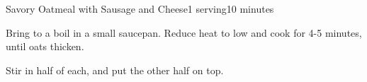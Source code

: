 \documentclass[../Cookbook.tex]{subfiles}
\begin{document}
\begin{recipe}{Savory Oatmeal with Sausage and Cheese}{1 serving}{10 minutes}

Bring to a boil in a small saucepan. Reduce heat to low and cook for 4-5 minutes, until oats thicken.

Stir in half of each, and put the other half on top.

\end{recipe}
\end{document}
